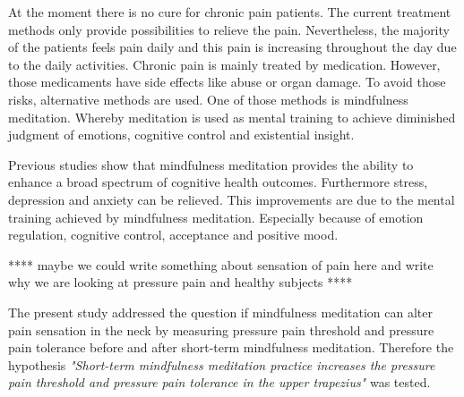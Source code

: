 At the moment there is no cure for chronic pain patients. The current treatment methods only provide possibilities to relieve the pain. \cite{marcus2009,pope2017} Nevertheless, the majority of the patients feels pain daily and this pain is increasing throughout the day due to the daily activities. \cite{Breivik2006}
Chronic pain is mainly treated by medication. However, those medicaments have side effects like abuse or organ damage. To avoid those risks, alternative methods are used. One of those methods is mindfulness meditation. Whereby meditation is used as mental training to achieve diminished judgment of emotions, cognitive control and existential insight. \cite{Zeidan2012}

Previous studies show that mindfulness meditation provides the ability to enhance a broad spectrum of cognitive health outcomes. Furthermore stress, depression and anxiety can be relieved. This improvements are due to the mental training achieved by mindfulness meditation. Especially because of emotion regulation, cognitive control, acceptance and positive mood. \cite{Zeidan2012,Zeidan2016} 

**** maybe we could write something about sensation of pain here and write why we are looking at pressure pain and healthy subjects ****

The present study addressed the question if mindfulness meditation can alter pain sensation in the neck by measuring pressure pain threshold and pressure pain tolerance before and after short-term mindfulness meditation. Therefore the hypothesis  \textit{"Short-term mindfulness meditation practice increases the pressure pain threshold and pressure pain tolerance in the upper trapezius"} was tested.

